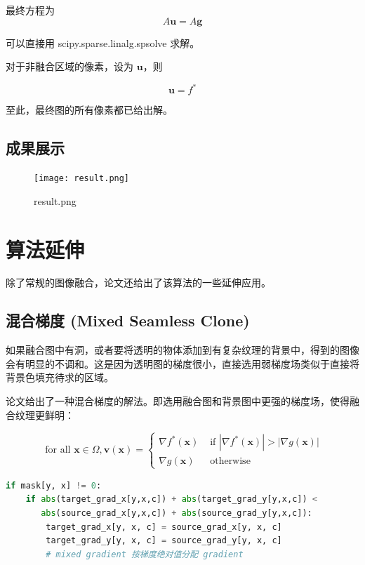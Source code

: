 \documentclass[lang=cn,11pt,a4paper]{elegantpaper}
\begin{document}
最终方程为
\begin{equation}
    A\mathbf{u} = A\mathbf{g}
\end{equation}

可以直接用 scipy.sparse.linalg.spsolve 求解。

对于非融合区域的像素，设为 $\mathbf{u}$，则

\begin{equation}
    \mathbf{u} = f^*
\end{equation}

至此，最终图的所有像素都已给出解。

\subsection{成果展示}

\begin{figure}[ht]
    \centering
    \texttt{[image: result.png]}
    \caption{result.png}
\end{figure}

\section{算法延伸}

除了常规的图像融合，论文还给出了该算法的一些延伸应用。

\subsection{混合梯度 (Mixed Seamless Clone)}

如果融合图中有洞，或者要将透明的物体添加到有复杂纹理的背景中，得到的图像会有明显的不调和。这是因为透明图的梯度很小，直接选用弱梯度场类似于直接将背景色填充待求的区域。

论文给出了一种混合梯度的解法。即选用融合图和背景图中更强的梯度场，使得融合纹理更鲜明：

\begin{equation}
    \text { for all } \mathbf{x} \in \Omega, \mathbf{v}(\mathbf{x})= \begin{cases}\nabla f^{*}(\mathbf{x}) & \text { if }\left|\nabla f^{*}(\mathbf{x})\right|>|\nabla g(\mathbf{x})| \\ \nabla g(\mathbf{x}) & \text { otherwise }\end{cases}
\end{equation}

\begin{lstlisting}[language=Python]
if mask[y, x] != 0:
    if abs(target_grad_x[y,x,c]) + abs(target_grad_y[y,x,c]) < 
       abs(source_grad_x[y,x,c]) + abs(source_grad_y[y,x,c]):
        target_grad_x[y, x, c] = source_grad_x[y, x, c]
        target_grad_y[y, x, c] = source_grad_y[y, x, c]
        # mixed gradient 按梯度绝对值分配 gradient
\end{lstlisting}
\end{document}
